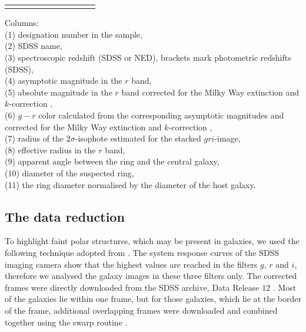 \documentclass[a4paper,fleqn,usenatbib]{mnras}
\begin{document}
\begin{table}
\begin{minipage}{180mm}
\begin{tabular}{ccccccccccc}
  \hline\\
  \end{tabular}

\end{minipage}
   
   \parbox[t]{160mm}{ Columns: \\
   (1) designation number in the sample, \\
   (2) SDSS name,  \\
   (3) spectroscopic redshift (SDSS or NED), brackets mark photometric 
           redshifts (SDSS),  \\
   (4) asymptotic magnitude in the $r$ band, \\
   (5) absolute magnitude in the $r$ band corrected for the Milky Way 
           extinction \citep{schfin2011} and $k$-correction \citep{chil2010},  \\ 
   (6) $g - r$ color calculated from the corresponding asymptotic magnitudes and corrected for the Milky Way extinction \citep{schfin2011} 
           and $k$-correction \citep{chil2010},  \\ 
   (7) radius of the $2\sigma$-isophote estimated for the stacked $gri$-image, \\
   (8) effective radius in the $r$ band, \\
   (9) apparent angle between the ring and the central galaxy,  \\
   (10) diameter of the suspected ring,  \\
   (11) the ring diameter normalised by the diameter of the host galaxy.   }
   \end{table} 
    
    
    
\subsection{The data reduction}    
\label{reduction}
    
To highlight faint polar structures, which may be present in galaxies, 
we used the following technique adopted from \citet{2011A&A...536A..66M}.
The system response curves of the SDSS imaging camera \citep{gunncam1998} 
show that the highest values are reached in the filters $g$, $r$ and $i$, 
therefore we analysed the galaxy images in these three filters only. The corrected 
frames were directly downloaded from the SDSS archive, 
Data Release 12 \citep{2015ApJS..219...12A}. Most of the galaxies lie within 
one frame, but for those galaxies, which lie at the border of the frame, 
additional overlapping frames were downloaded and combined together using 
the {\sc swarp} routine \citep{2002ASPC..281..228B}. 
\end{document}
